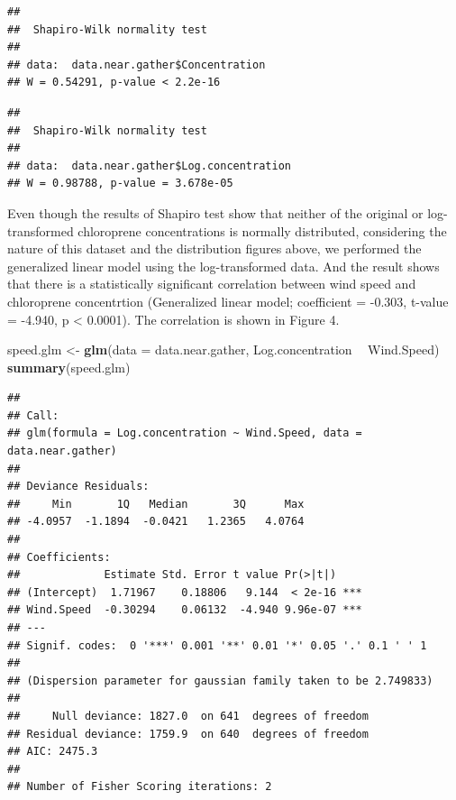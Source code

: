 \documentclass[12pt,]{article}
\newenvironment{Shaded}{\begin{snugshade}}{\end{snugshade}}
\newcommand{\KeywordTok}[1]{\textcolor[rgb]{0.13,0.29,0.53}{\textbf{#1}}}
\newcommand{\DataTypeTok}[1]{\textcolor[rgb]{0.13,0.29,0.53}{#1}}
\newcommand{\StringTok}[1]{\textcolor[rgb]{0.31,0.60,0.02}{#1}}
\newcommand{\CommentTok}[1]{\textcolor[rgb]{0.56,0.35,0.01}{\textit{#1}}}
\newcommand{\OperatorTok}[1]{\textcolor[rgb]{0.81,0.36,0.00}{\textbf{#1}}}
\newcommand{\NormalTok}[1]{#1}
\begin{document}
\begin{Shaded}
\end{Shaded}

\begin{verbatim}
## 
##  Shapiro-Wilk normality test
## 
## data:  data.near.gather$Concentration
## W = 0.54291, p-value < 2.2e-16
\end{verbatim}

\begin{Shaded}
\end{Shaded}

\begin{verbatim}
## 
##  Shapiro-Wilk normality test
## 
## data:  data.near.gather$Log.concentration
## W = 0.98788, p-value = 3.678e-05
\end{verbatim}

Even though the results of Shapiro test show that neither of the
original or log-transformed chloroprene concentrations is normally
distributed, considering the nature of this dataset and the distribution
figures above, we performed the generalized linear model using the
log-transformed data. And the result shows that there is a statistically
significant correlation between wind speed and chloroprene concentrtion
(Generalized linear model; coefficient = -0.303, t-value = -4.940, p
\textless{} 0.0001). The correlation is shown in Figure 4.

\begin{Shaded}
\begin{Highlighting}[]
\NormalTok{speed.glm <-}\StringTok{ }\KeywordTok{glm}\NormalTok{(}\DataTypeTok{data =}\NormalTok{ data.near.gather, Log.concentration }\OperatorTok{~}\StringTok{ }\NormalTok{Wind.Speed)}
\KeywordTok{summary}\NormalTok{(speed.glm)}
\end{Highlighting}
\end{Shaded}

\begin{verbatim}
## 
## Call:
## glm(formula = Log.concentration ~ Wind.Speed, data = data.near.gather)
## 
## Deviance Residuals: 
##     Min       1Q   Median       3Q      Max  
## -4.0957  -1.1894  -0.0421   1.2365   4.0764  
## 
## Coefficients:
##             Estimate Std. Error t value Pr(>|t|)    
## (Intercept)  1.71967    0.18806   9.144  < 2e-16 ***
## Wind.Speed  -0.30294    0.06132  -4.940 9.96e-07 ***
## ---
## Signif. codes:  0 '***' 0.001 '**' 0.01 '*' 0.05 '.' 0.1 ' ' 1
## 
## (Dispersion parameter for gaussian family taken to be 2.749833)
## 
##     Null deviance: 1827.0  on 641  degrees of freedom
## Residual deviance: 1759.9  on 640  degrees of freedom
## AIC: 2475.3
## 
## Number of Fisher Scoring iterations: 2
\end{verbatim}
\end{document}
